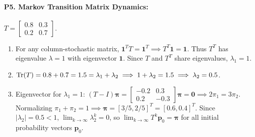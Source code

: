 \paragraph{P5. Markov Transition Matrix Dynamics:}
$T = \begin{bmatrix} 0.8 & 0.3 \\ 0.2 & 0.7 \end{bmatrix}$.
\begin{enumerate}[label=(\alph*)]
    \item For any column-stochastic matrix, $\mathbf{1}^T T = \mathbf{1}^T \implies T^T \mathbf{1} = \mathbf{1}$. Thus $T^T$ has eigenvalue $\lambda = 1$ with eigenvector $\mathbf{1}$. Since $T$ and $T^T$ share eigenvalues, $\lambda_1 = 1$.
    \item $\operatorname{Tr}(T) = 0.8 + 0.7 = 1.5 = \lambda_1 + \lambda_2 \implies 1 + \lambda_2 = 1.5 \implies \lambda_2 = 0.5$.
    \item Eigenvector for $\lambda_1 = 1$: $(T - I)\boldsymbol{\pi} = \begin{bmatrix} -0.2 & 0.3 \\ 0.2 & -0.3 \end{bmatrix}\boldsymbol{\pi} = \mathbf{0} \implies 2\pi_1 = 3\pi_2$.
    Normalizing $\pi_1 + \pi_2 = 1 \implies \boldsymbol{\pi} = [3/5, 2/5]^T = [0.6, 0.4]^T$.
    Since $|\lambda_2| = 0.5 < 1$, $\lim_{k \to \infty} \lambda_2^k = 0$, so $\lim_{k \to \infty} T^k \mathbf{p}_0 = \boldsymbol{\pi}$ for all initial probability vectors $\mathbf{p}_0$.
\end{enumerate}

